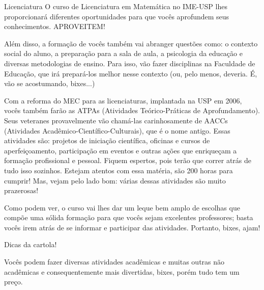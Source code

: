\begin{subsecao}{Licenciatura}
O curso de Licenciatura em Matemática no IME-USP lhes proporcionará diferentes oportunidades para
que vocês aprofundem seus conhecimentos. APROVEITEM!

Além disso, a formação de vocês também vai abranger questões como: o contexto
social do aluno, a preparação para a sala de aula, a psicologia da educação e
diversas metodologias de ensino. Para isso, vão fazer disciplinas na
Faculdade de Educação, que irá prepará-los melhor nesse contexto (ou, pelo
menos, deveria. É, vão se acostumando, bixes...)

Com a reforma do MEC para as licenciaturas, implantada na USP em 2006,
vocês também farão as ATPAs (Atividades Teórico-Práticas de Aprofundamento).
Seus veteranes provavelmente vão chamá-las carinhosamente de AACCs (Atividades
Acadêmico-Científico-Culturais), que é o nome antigo. Essas atividades são:
projetos de iniciação científica, oficinas e cursos de aperfeiçoamento,
participação em eventos e outras ações que enriqueçam a formação profissional e
pessoal. Fiquem espertos, pois terão que correr atrás de tudo isso sozinhos.
Estejam atentos com essa matéria, são 200 horas para cumprir! Mas, vejam pelo
lado bom: várias dessas atividades são muito prazerosas!

Como podem ver, o curso vai lhes dar um leque bem amplo de escolhas que
compõe uma sólida formação para que vocês sejam excelentes professores; basta 
vocês irem atrás de se informar e participar das atividades. Portanto, bixes, ajam!

\begin{subsubsecao}{Dicas da cartola!}

Vocês podem fazer diversas atividades acadêmicas e muitas outras não acadêmicas e
consequentemente mais divertidas, bixes, porém tudo tem um preço.


\end{subsubsecao}
\end{subsecao}
